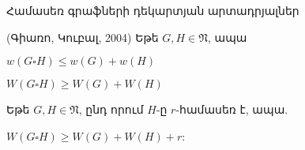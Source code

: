 \begin{frame}{Համասեռ գրաֆների դեկարտյան արտադրյալներ}

(Գիառո, Կուբալ, 2004) Եթե $G,H\in \mathfrak{N}$, ապա 
\begin{center}
$w(G\square H)\leq w(G)+w(H)$
\end{center}
\begin{center}
$W(G\square H)\geq W(G)+W(H)$
\end{center}


\begin{theorem}[2.2.1]
Եթե $G,H\in \mathfrak{N}$, ընդ որում $H$-ը $r$-համասեռ է, ապա.
\begin{center}
$W(G\square H)\geq W(G)+W(H)+r$:
\end{center}
\end{theorem}
\end{frame}

